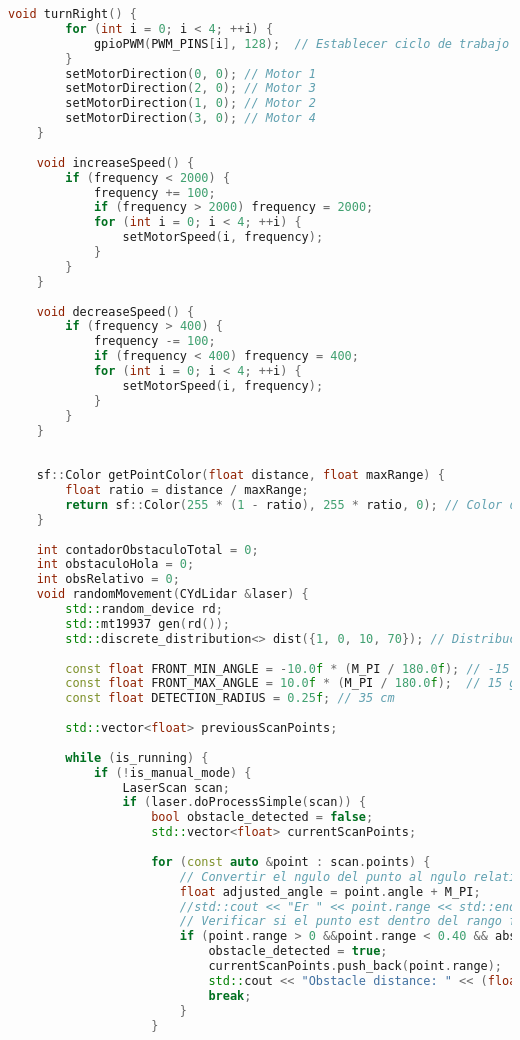 \begin{lstlisting}[language={C++}, caption={Primer ajuste de c\'odigo}, label={PrimerAjuste}]
    void turnRight() {
        for (int i = 0; i < 4; ++i) {
            gpioPWM(PWM_PINS[i], 128);  // Establecer ciclo de trabajo al 50%
        }
        setMotorDirection(0, 0); // Motor 1
        setMotorDirection(2, 0); // Motor 3
        setMotorDirection(1, 0); // Motor 2
        setMotorDirection(3, 0); // Motor 4
    }
    
    void increaseSpeed() {
        if (frequency < 2000) {
            frequency += 100;
            if (frequency > 2000) frequency = 2000;
            for (int i = 0; i < 4; ++i) {
                setMotorSpeed(i, frequency);
            }
        }
    }
    
    void decreaseSpeed() {
        if (frequency > 400) {
            frequency -= 100;
            if (frequency < 400) frequency = 400;
            for (int i = 0; i < 4; ++i) {
                setMotorSpeed(i, frequency);
            }
        }
    }
    
    
    sf::Color getPointColor(float distance, float maxRange) {
        float ratio = distance / maxRange;
        return sf::Color(255 * (1 - ratio), 255 * ratio, 0); // Color de rojo a verde
    }
    
    int contadorObstaculoTotal = 0;
    int obstaculoHola = 0;
    int obsRelativo = 0;
    void randomMovement(CYdLidar &laser) {
        std::random_device rd;
        std::mt19937 gen(rd());
        std::discrete_distribution<> dist({1, 0, 10, 70}); // Distribucin para la probabilidad de movimiento
    
        const float FRONT_MIN_ANGLE = -10.0f * (M_PI / 180.0f); // -15 grados en radaianes
        const float FRONT_MAX_ANGLE = 10.0f * (M_PI / 180.0f);  // 15 grados en radianes
        const float DETECTION_RADIUS = 0.25f; // 35 cm
    
        std::vector<float> previousScanPoints;
    
        while (is_running) {
            if (!is_manual_mode) {
                LaserScan scan;
                if (laser.doProcessSimple(scan)) {
                    bool obstacle_detected = false;
                    std::vector<float> currentScanPoints;
                    
                    for (const auto &point : scan.points) {
                        // Convertir el ngulo del punto al ngulo relativo al "sur" del robot
                        float adjusted_angle = point.angle + M_PI;
                        //std::cout << "Er " << point.range << std::endl;
                        // Verificar si el punto est dentro del rango frontal de 30
                        if (point.range > 0 &&point.range < 0.40 && abs(point.angle) < adjusted_angle) {
                            obstacle_detected = true;
                            currentScanPoints.push_back(point.range);
                            std::cout << "Obstacle distance: " << (float)point.range  << " Y en el angulo  "<<point.angle << std::endl;
                            break;
                        }
                    }
                    

\end{lstlisting}
